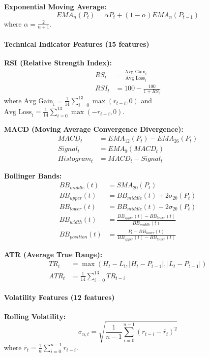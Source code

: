 \documentclass[12pt,a4paper]{article}
\begin{document}
\textbf{Exponential Moving Average:}
\begin{equation}
EMA_n(P_t) = \alpha P_t + (1-\alpha) EMA_n(P_{t-1})
\end{equation}
where $\alpha = \frac{2}{n+1}$.

\paragraph{Technical Indicator Features (15 features)}

\textbf{RSI (Relative Strength Index):}
\begin{align}
RS_t &= \frac{\text{Avg Gain}_t}{\text{Avg Loss}_t} \\
RSI_t &= 100 - \frac{100}{1 + RS_t}
\end{align}
where $\text{Avg Gain}_t = \frac{1}{14}\sum_{i=0}^{13} \max(r_{t-i}, 0)$ and $\text{Avg Loss}_t = \frac{1}{14}\sum_{i=0}^{13} \max(-r_{t-i}, 0)$.

\textbf{MACD (Moving Average Convergence Divergence):}
\begin{align}
MACD_t &= EMA_{12}(P_t) - EMA_{26}(P_t) \\
Signal_t &= EMA_9(MACD_t) \\
Histogram_t &= MACD_t - Signal_t
\end{align}

\textbf{Bollinger Bands:}
\begin{align}
BB_{middle}(t) &= SMA_{20}(P_t) \\
BB_{upper}(t) &= BB_{middle}(t) + 2\sigma_{20}(P_t) \\
BB_{lower}(t) &= BB_{middle}(t) - 2\sigma_{20}(P_t) \\
BB_{width}(t) &= \frac{BB_{upper}(t) - BB_{lower}(t)}{BB_{middle}(t)} \\
BB_{position}(t) &= \frac{P_t - BB_{lower}(t)}{BB_{upper}(t) - BB_{lower}(t)}
\end{align}

\textbf{ATR (Average True Range):}
\begin{align}
TR_t &= \max(H_t - L_t, |H_t - P_{t-1}|, |L_t - P_{t-1}|) \\
ATR_t &= \frac{1}{14}\sum_{i=0}^{13} TR_{t-i}
\end{align}

\paragraph{Volatility Features (12 features)}

\textbf{Rolling Volatility:}
\begin{equation}
\sigma_{n,t} = \sqrt{\frac{1}{n-1}\sum_{i=0}^{n-1} (r_{t-i} - \bar{r}_t)^2}
\end{equation}
where $\bar{r}_t = \frac{1}{n}\sum_{i=0}^{n-1} r_{t-i}$.
\end{document}
